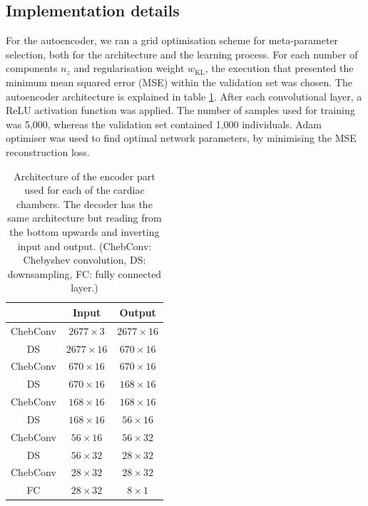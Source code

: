 \documentclass[fleqn,10pt]{wlscirep}
\begin{document}
\subsection{Implementation details}
For the autoencoder, we ran a grid optimisation scheme for meta-parameter selection, both for the architecture and the learning process. For each number of components $n_z$ and regularisation weight $w_\textrm{KL}$, the execution that presented the minimum mean squared error (MSE) within the validation set was chosen.
The autoencoder architecture is explained in table \ref{table:AE_arch}. After each convolutional layer, a ReLU activation function was applied. The number of samples used for training was 5,000, whereas the validation set contained 1,000 individuals. Adam optimiser was used to find optimal network parameters, by minimising the MSE reconstruction loss.

\begin{table}
\begin{center}
\begin{tabular}{|c|c|c|}
\hline
          & \textbf{Input} & \textbf{Output} \\ \hline
ChebConv  & $2677\times 3$ &  $2677\times 16$ \\ \hline
DS        & $2677\times 16$ & $670\times 16$ \\ \hline
ChebConv  & $670\times 16$ & $670\times 16$ \\ \hline
DS        & $670\times 16$ & $168\times 16$ \\ \hline
ChebConv  & $168\times 16$ & $168\times 16$ \\ \hline
DS        & $168\times 16$ & $56\times 16$\\ \hline
ChebConv  & $56\times 16$ &  $56\times 32$\\ \hline
DS        & $56\times 32$ &  $28\times 32$\\ \hline
ChebConv  & $28\times 32$ &  $28\times 32$\\ \hline
FC        & $28\times 32$ &  $8\times 1$\\ \hline
\end{tabular}
\end{center}
\label{table:AE_arch}
\caption{Architecture of the encoder part used for each of the cardiac chambers. The decoder has the same architecture but reading from the bottom upwards and inverting input and output. (ChebConv: Chebyshev convolution, DS: downsampling, FC: fully connected layer.)}
\end{table}
\end{document}
